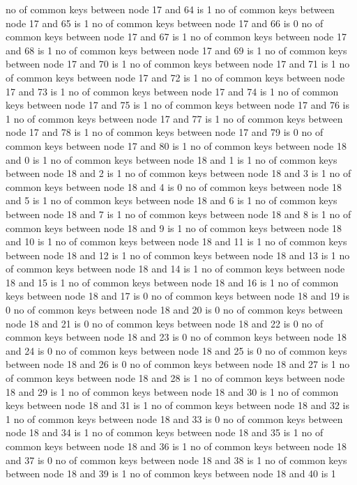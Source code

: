 no of common keys between node 17 and 64 is 1
no of common keys between node 17 and 65 is 1
no of common keys between node 17 and 66 is 0
no of common keys between node 17 and 67 is 1
no of common keys between node 17 and 68 is 1
no of common keys between node 17 and 69 is 1
no of common keys between node 17 and 70 is 1
no of common keys between node 17 and 71 is 1
no of common keys between node 17 and 72 is 1
no of common keys between node 17 and 73 is 1
no of common keys between node 17 and 74 is 1
no of common keys between node 17 and 75 is 1
no of common keys between node 17 and 76 is 1
no of common keys between node 17 and 77 is 1
no of common keys between node 17 and 78 is 1
no of common keys between node 17 and 79 is 0
no of common keys between node 17 and 80 is 1
no of common keys between node 18 and 0 is 1
no of common keys between node 18 and 1 is 1
no of common keys between node 18 and 2 is 1
no of common keys between node 18 and 3 is 1
no of common keys between node 18 and 4 is 0
no of common keys between node 18 and 5 is 1
no of common keys between node 18 and 6 is 1
no of common keys between node 18 and 7 is 1
no of common keys between node 18 and 8 is 1
no of common keys between node 18 and 9 is 1
no of common keys between node 18 and 10 is 1
no of common keys between node 18 and 11 is 1
no of common keys between node 18 and 12 is 1
no of common keys between node 18 and 13 is 1
no of common keys between node 18 and 14 is 1
no of common keys between node 18 and 15 is 1
no of common keys between node 18 and 16 is 1
no of common keys between node 18 and 17 is 0
no of common keys between node 18 and 19 is 0
no of common keys between node 18 and 20 is 0
no of common keys between node 18 and 21 is 0
no of common keys between node 18 and 22 is 0
no of common keys between node 18 and 23 is 0
no of common keys between node 18 and 24 is 0
no of common keys between node 18 and 25 is 0
no of common keys between node 18 and 26 is 0
no of common keys between node 18 and 27 is 1
no of common keys between node 18 and 28 is 1
no of common keys between node 18 and 29 is 1
no of common keys between node 18 and 30 is 1
no of common keys between node 18 and 31 is 1
no of common keys between node 18 and 32 is 1
no of common keys between node 18 and 33 is 0
no of common keys between node 18 and 34 is 1
no of common keys between node 18 and 35 is 1
no of common keys between node 18 and 36 is 1
no of common keys between node 18 and 37 is 0
no of common keys between node 18 and 38 is 1
no of common keys between node 18 and 39 is 1
no of common keys between node 18 and 40 is 1
